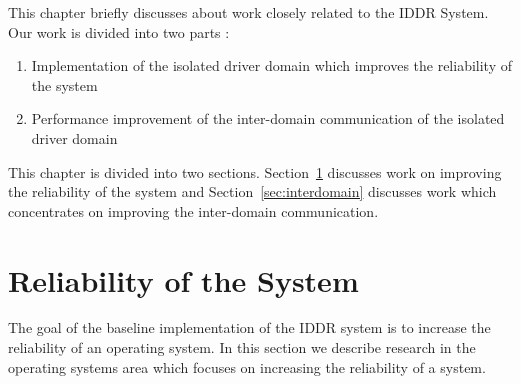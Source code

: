 
This chapter briefly discusses about work closely related to the IDDR System. Our work is divided into two parts : 
\begin{enumerate}
\item Implementation of the isolated driver domain which improves the reliability of the system 
\item Performance improvement of the inter-domain communication of the isolated driver domain 
\end{enumerate}
This chapter is divided into two sections. Section~\ref{sec:robustness} discusses work on improving the reliability of the system and Section~\ref{sec:interdomain} discusses work which concentrates on improving the inter-domain communication.
\\[3mm]

\section{Reliability of the System}
\label{sec:robustness}
The goal of the baseline implementation of the IDDR system is to increase the reliability of an operating system. In this section we describe research in the operating systems area which focuses on increasing the reliability of a system.

